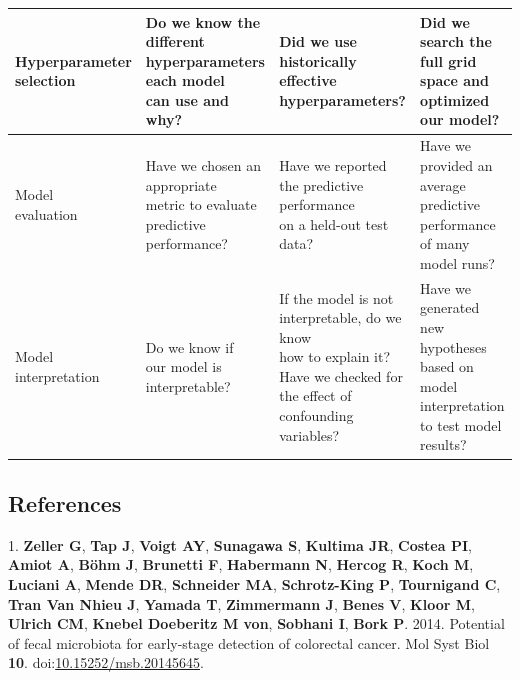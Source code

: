 \documentclass[11pt,]{article}
\begin{document}
\begin{tabular}{|l|l|l|l|}
\makecell[l]{Hyperparameter \\ selection} & \makecell[l]{Do we know the different \\ hyperparameters each model \\ can use and why?} & \makecell[l]{Did we use historically \\ effective hyperparameters? } & \makecell[l]{Did we search the \\ full grid space and \\optimized our model? } \\ \hline

\makecell[l]{Model \\ evaluation} & \makecell[l]{Have we chosen an appropriate \\ metric to evaluate \\ predictive performance?} & \makecell[l]{Have we reported \\ the predictive performance \\ on a held-out test data?} & \makecell[l]{Have we provided an average \\ predictive performance \\ of many model runs? } \\ \hline

\makecell[l]{Model \\ interpretation} & \makecell[l]{Do we know if \\ our model is \\ interpretable?} & \makecell[l]{If the model is not \\ interpretable, do we know \\how to  explain it? \\ Have we checked for \\ the effect of confounding \\ variables?} & \makecell[l]{Have we generated new \\ hypotheses based on \\ model interpretation \\ to test model results? } \\ \hline

\end{tabular}\newpage

\subsection{References}\label{references}

\hypertarget{refs}{}
\hypertarget{ref-zeller_potential_2014}{}
1. \textbf{Zeller G}, \textbf{Tap J}, \textbf{Voigt AY},
\textbf{Sunagawa S}, \textbf{Kultima JR}, \textbf{Costea PI},
\textbf{Amiot A}, \textbf{Böhm J}, \textbf{Brunetti F},
\textbf{Habermann N}, \textbf{Hercog R}, \textbf{Koch M},
\textbf{Luciani A}, \textbf{Mende DR}, \textbf{Schneider MA},
\textbf{Schrotz-King P}, \textbf{Tournigand C}, \textbf{Tran Van Nhieu
J}, \textbf{Yamada T}, \textbf{Zimmermann J}, \textbf{Benes V},
\textbf{Kloor M}, \textbf{Ulrich CM}, \textbf{Knebel Doeberitz M von},
\textbf{Sobhani I}, \textbf{Bork P}. 2014. Potential of fecal microbiota
for early-stage detection of colorectal cancer. Mol Syst Biol
\textbf{10}.
doi:\href{https://doi.org/10.15252/msb.20145645}{10.15252/msb.20145645}.
\end{document}
